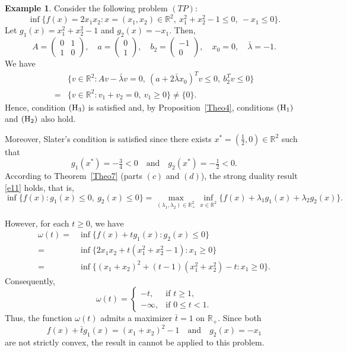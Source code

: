 \documentclass[]{interact}
\theoremstyle{plain}%
\theoremstyle{definition}
\newtheorem{example}[theorem]{Example}
\theoremstyle{remark}
\begin{document}
	
	\begin{example}
		Consider the following problem $(TP)$:
		\begin{equation}\label{e16a} 
			\inf \{f(x)=2x_1x_2: x=(x_1,x_2)\in \mathbb{R}^2,\ x_1^2+x_2^2-1\leq0,\ -x_1\leq 0\}.
		\end{equation}
		Let $g_1(x)=x_1^2+x_2^2-1$ and $g_2(x)=-x_1$. Then,
		\[
		A=\begin{pmatrix} 
			0 & 1\\
			1 & 0 
		\end{pmatrix},\quad
		a=\begin{pmatrix} 
			0\\
			1
		\end{pmatrix},\quad
		b_2=\begin{pmatrix}
			-1\\
			0
		\end{pmatrix},\quad
		x_0=0,\quad
		\bar\lambda=-1.
		\]
		We have
		\begin{align*}
			&\{v\in \mathbb{R}^2: Av-\bar \lambda v=0,\ (a+2\bar \lambda x_0)^Tv\leq0,\ b_2^Tv\leq0\}\\
			=&\{v\in \mathbb{R}^2: v_1+v_2=0,\ v_1\geq 0\}\neq\{0\}.
		\end{align*}
		Hence, condition $({\rm H_3})$ is satisfied and, by Proposition~\ref{Theo4}, conditions $({\rm H_1})$ and $({\rm H_2})$ also hold.
		
		Moreover, Slater’s condition is satisfied since there exists
		$x^*=(\tfrac12,0)\in\mathbb{R}^2$
		such that
		$$
		g_1(x^*)=-\tfrac34<0
		\quad\text{and}\quad
		g_2(x^*)=-\tfrac12<0.
		$$
		According to Theorem~\ref{Theo7} (parts $(c)$ and $(d)$), the strong duality result \eqref{e11} holds, that is,
		\begin{equation*}
			\inf \{f(x): g_1(x)\leq 0,\ g_2(x)\leq 0\}
			=
			\max_{(\lambda_1,\lambda_2)\in \mathbb{R}^2_+}
			\inf_{x\in \mathbb{R}^2}
			\bigg\{f(x)+\lambda_1g_1(x)+\lambda_2g_2(x)\bigg\}.
		\end{equation*}
		
		However, for each $t\geq0$, we have
		\begin{align*}
			\omega(t)
			=&\inf \{f(x)+tg_1(x): g_2(x)\leq 0\}\\
			=&\inf \{2x_1x_2+t(x_1^2+x_2^2-1): x_1\geq 0\}\\
			=&\inf \{(x_1+x_2)^2+(t-1)(x_1^2+x_2^2)-t: x_1\geq0\}.
		\end{align*}
		Consequently,
		\[
		\omega(t)=
		\begin{cases}
			-t, & \text{if } t\geq 1,\\
			-\infty, & \text{if } 0\leq t<1.
		\end{cases}
		\]
		Thus, the function $\omega(t)$ admits a maximizer $\bar t=1$ on $\mathbb{R}_+$. Since both
		\[
		f(x)+\bar t g_1(x)=(x_1+x_2)^2-1
		\quad\text{and}\quad
		g_2(x)=-x_1
		\]
		are not strictly convex, the result in \cite[Theorem~4]{TuyTuan2013} cannot be applied to this problem.
	\end{example}
	
\end{document}
